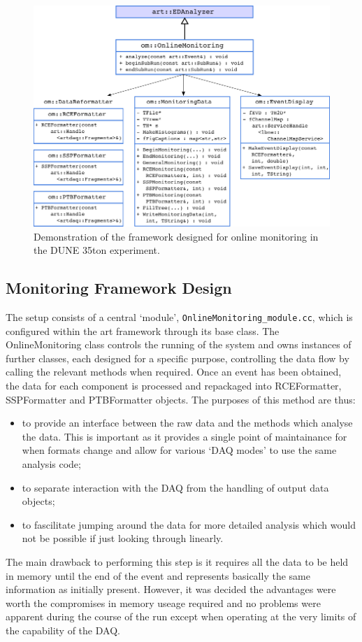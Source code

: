 \begin{figure}[ht]
  \centering
  \includegraphics[width=12cm]{onlineMonitoringFramework.png}
  \caption{Demonstration of the framework designed for online monitoring in the DUNE 35ton experiment.}
  \label{fig:OnlineMonitoringFramework}
\end{figure}

\subsection{Monitoring Framework Design}\label{sec:MonitoringFrameworkDesign}

The setup consists of a central `module', \texttt{OnlineMonitoring\_module.cc}, which is configured within the art framework through its base class.  The OnlineMonitoring class controls the running of the system and owns instances of further classes, each designed for a specific purpose, controlling the data flow by calling the relevant methods when required.  Once an event has been obtained, the data for each component is processed and repackaged into RCEFormatter, SSPFormatter and PTBFormatter objects.  The purposes of this method are thus:
\begin{itemize}
\item to provide an interface between the raw data and the methods which analyse the data.  This is important as it provides a single point of maintainance for when formats change and allow for various `DAQ modes' to use the same analysis code;
\item to separate interaction with the DAQ from the handling of output data objects;
\item to fascilitate jumping around the data for more detailed analysis which would not be possible if just looking through linearly.
\end{itemize}
The main drawback to performing this step is it requires all the data to be held in memory until the end of the event and represents basically the same information as initially present.  However, it was decided the advantages were worth the compromises in memory useage required and no problems were apparent during the course of the run except when operating at the very limits of the capability of the DAQ.

